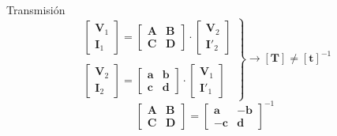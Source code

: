 \documentclass[xcolor={usenames,svgnames,dvipsnames}]{beamer}
\begin{document}
\begin{frame}[label={sec:org3938d90}]{Transmisión}
\[
  \left.
    \begin{array}{l}
  \left[
    \begin{array}{c}
      \mathbf{V}_1\\
      \mathbf{I}_1
    \end{array}
  \right] =
  \left[
    \begin{array}{cc}
      \mathbf{A} & \mathbf{B}\\
      \mathbf{C} & \mathbf{D}
    \end{array}
  \right] \cdot
  \left[
    \begin{array}{c}
      \mathbf{V}_2\\
      \mathbf{I'}_2
    \end{array}
  \right]
      \\ \\
  \left[
    \begin{array}{c}
      \mathbf{V}_2\\
      \mathbf{I}_2
    \end{array}
  \right] =
  \left[
    \begin{array}{cc}
      \mathbf{a} & \mathbf{b}\\
      \mathbf{c} & \mathbf{d}
    \end{array}
  \right] \cdot
  \left[
    \begin{array}{c}
      \mathbf{V}_1\\
      \mathbf{I'}_1
    \end{array}
  \right]
      \end{array}
    \right\}
    \rightarrow
    \boxed{[\mathbf{T}] \neq [\mathbf{t}]^{-1}}
  \]
\[
  \boxed{
    \left[
      \begin{array}{cc}
        \mathbf{A} & \mathbf{B}\\
        \mathbf{C} & \mathbf{D}
      \end{array}\right] = 
      \left[
      \begin{array}{cc}
        \mathbf{a} & \mathbf{-b}\\
        \mathbf{-c} & \mathbf{d}
      \end{array}
      \right]^{-1}
    }
\]
\end{frame}
\end{document}
